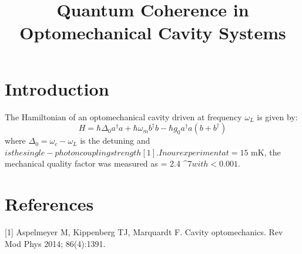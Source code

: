 \documentclass{article}
\title{Quantum Coherence in Optomechanical Cavity Systems}
\begin{document}
\section{Introduction}
The Hamiltonian of an optomechanical cavity driven at frequency $\omega_L$ is given by:
\begin{equation}
H = \hbar \Delta_0 a^\dagger a + \hbar \omega_m b^\dagger b - \hbar g_0 a^\dagger a (b + b^\dagger)
\end{equation}
where $\Delta_0 = \omega_c - \omega_L$ is the detuning and $ is the single-photon coupling strength [1]. In our experiment at  = 15$ mK, the mechanical quality factor was measured as  = 2.4 ^7$ with  < 0.001$.
\section{References}
[1] Aspelmeyer M, Kippenberg TJ, Marquardt F. Cavity optomechanics. Rev Mod Phys 2014; 86(4):1391.
\end{document}
